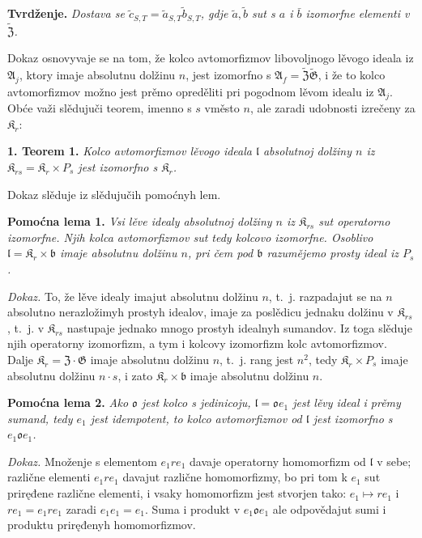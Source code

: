 \documentclass[11pt]{article}
\begin{document}
\noindent\textbf{Tvrdženje.} \emph{Dostava se \(\tilde c_{S,T}=\tilde a_{S,T}\tilde b_{S,T}\), gdje \(\tilde a,\tilde b\) sut s \(a\) i \(\bar b\) izomorfne elementi v \(\widetilde{\mathfrak Z}\).}

Dokaz osnovyvaje se na tom, že kolco avtomorfizmov libovoljnogo lěvogo ideala iz \(\mathfrak A_j\), ktory imaje absolutnu dolžinu \(n\), jest izomorfno s \(\mathfrak A_f=\widetilde{\mathfrak Z}\widetilde{\mathfrak G}\), i že to kolco avtomorfizmov možno jest prěmo opreděliti pri pogodnom lěvom idealu iz \(\mathfrak A_j\). Obće važi slědujuči teorem, imenno s \(s\) vměsto \(n\), ale zaradi udobnosti izrečeny za \(\mathfrak K_r\):

\noindent\textbf{1. Teorem 1.} \emph{Kolco avtomorfizmov lěvogo ideala \(\mathfrak l\) absolutnoj dolžiny \(n\) iz \(\mathfrak K_{rs}=\mathfrak K_r\times P_s\) jest izomorfno s \(\mathfrak K_r\).}

Dokaz slěduje iz slědujučih pomoćnyh lem.

\noindent\textbf{Pomoćna lema 1.} \emph{Vsi lěve idealy absolutnoj dolžiny \(n\) iz \(\mathfrak K_{rs}\) sut operatorno izomorfne. Njih kolca avtomorfizmov sut tedy kolcovo izomorfne. Osoblivo \(\mathfrak l=\mathfrak K_r\times\mathfrak b\) imaje absolutnu dolžinu \(n\), pri čem pod \(\mathfrak b\) razumějemo prosty ideal iz \(P_s\).}

\noindent\emph{Dokaz.} To, že lěve idealy imajut absolutnu dolžinu \(n\), t.~j. razpadajut se na \(n\) absolutno nerazložimyh prostyh idealov, imaje za poslědicu jednaku dolžinu v \(\mathfrak K_{rs}\), t.~j. v \(\mathfrak K_{rs}\) nastupaje jednako mnogo prostyh idealnyh sumandov. Iz toga slěduje njih operatorny izomorfizm, a tym i kolcovy izomorfizm kolc avtomorfizmov. Dalje \(\mathfrak K_r=\mathfrak Z\cdot\mathfrak G\) imaje absolutnu dolžinu \(n\), t.~j. rang jest \(n^2\), tedy \(\mathfrak K_r\times P_s\) imaje absolutnu dolžinu \(n\cdot s\), i zato \(\mathfrak K_r\times\mathfrak b\) imaje absolutnu dolžinu \(n\).

\noindent\textbf{Pomoćna lema 2.} \emph{Ako \(\mathfrak o\) jest kolco s jedinicoju, \(\mathfrak l=\mathfrak o e_1\) jest lěvy ideal i prěmy sumand, tedy \(e_1\) jest idempotent, to kolco avtomorfizmov od \(\mathfrak l\) jest izomorfno s \(e_1\mathfrak o e_1\).}

\noindent\emph{Dokaz.} Množenje s elementom \(e_1re_1\) davaje operatorny homomorfizm od \(\mathfrak l\) v sebe; različne elementi \(e_1re_1\) davajut različne homomorfizmy, bo pri tom k \(e_1\) sut priręđene različne elementi, i vsaky homomorfizm jest stvorjen tako: \(e_1\mapsto re_1\) i \(re_1=e_1re_1\) zaradi \(e_1e_1=e_1\). Suma i produkt v \(e_1\mathfrak o e_1\) ale odpovědajut sumi i produktu priręđenyh homomorfizmov.
\end{document}

